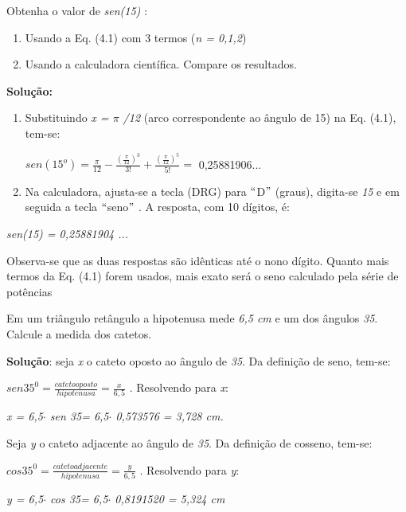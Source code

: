 \begin{texemplo}
Obtenha o valor de \textit{sen(15\degree)} :

\begin{enumerate}
    \item Usando a Eq. (4.1) com 3 termos (\textit{n = 0,1,2})

    \item Usando a calculadora científica. Compare os resultados.
\end{enumerate}

\textbf{Solução: }

\begin{enumerate}
    \item Substituindo \textit{x = $ \pi $ /12} (arco correspondente ao ângulo de 15\degree ) na Eq. (4.1), tem-se:

 \( sen \left( 15^{o} \right) =\frac{ \pi }{12}-\frac{ \left( \frac{ \pi }{12} \right) ^{3}}{3!}+\frac{ \left( \frac{ \pi }{12} \right) ^{5}}{5!}=  \) 0,25881906...

    \item Na calculadora, ajusta-se a tecla (DRG) para $``$D$"$  (graus), digita-se \textit{15} e em seguida a tecla $``$seno$"$ . A resposta, com 10 dígitos, é:
\end{enumerate}

\textit{sen(15\degree) = 0,25881904 ...}

Observa-se que as duas respostas são idênticas até o nono dígito. Quanto mais termos da Eq. (4.1) forem usados, mais exato será o seno calculado pela série de potências \qedsymbol
\end{texemplo}

\begin{texemplo}
Em um triângulo retângulo a hipotenusa mede \textit{6,5 cm} e um dos ângulos \textit{35\degree}. Calcule a medida dos catetos.

\textbf{Solução}: seja \textit{x} o cateto oposto ao ângulo de \textit{35\degree}. Da definição de seno, tem-se:

 \( sen 35^{0}=\frac{cateto oposto}{hipotenusa}=\frac{x}{6,5} \) . Resolvendo para \textit{x}:

\textit{x = 6,5$ \cdot $  sen 35\degree = 6,5$ \cdot $  0,573576  = 3,728 cm. }

Seja \textit{y} o cateto adjacente ao ângulo de \textit{35\degree}. Da definição de cosseno, tem-se:

 \( cos 35^{0}=\frac{cateto adjacente}{hipotenusa}=\frac{y}{6,5} \) . Resolvendo para \textit{y}:

\textit{y = 6,5$ \cdot $  cos 35\degree = 6,5$ \cdot $  0,8191520 = 5,324  cm }\qedsymbol
\end{texemplo}

